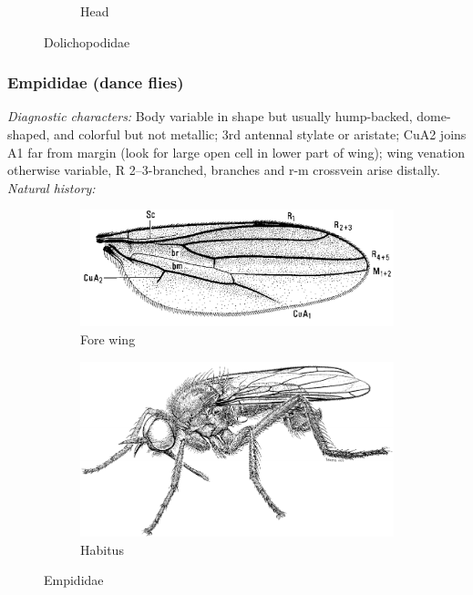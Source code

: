\documentclass[letterpaper, 11pt]{article}
\begin{document}
\begin{figure}[ht!]
\begin{subfigure}[ht!]{0.22\textwidth}
        \caption{Head \citep[][Fig. 48.4]{mcalpine1981manual}}
        \label{fig:dolicho2}
    \end{subfigure}
    \caption{Dolichopodidae}\label{fig:dolichos}
\end{figure}

\subsubsection{Empididae (dance flies)}
\noindent{}\textit{Diagnostic characters:} Body variable in shape but usually hump-backed, dome-shaped, and colorful but not metallic; 3rd antennal stylate or aristate; CuA2 joins A1 far from margin (look for large open cell in lower part of wing); wing venation otherwise variable, R 2--3-branched, branches and r-m crossvein arise distally.\\ %

\noindent{}\textit{Natural history:} \\

\begin{figure}[ht!]
    \centering
    \begin{subfigure}[ht!]{0.45\textwidth}
        \includegraphics[width=\textwidth]{EmpididWing}
        \caption{Fore wing \citep[][Fig. 47.3]{mcalpine1981manual}}
        \label{fig:empidid1}
    \end{subfigure}
    \qquad
    \begin{subfigure}[ht!]{0.42\textwidth}
        \includegraphics[width=\textwidth]{EmpididHabitus}
        \caption{Habitus \citep[][Fig. 47.1]{mcalpine1981manual}}
        \label{fig:empidid2}
    \end{subfigure}
    \caption{Empididae}\label{fig:empidids}
\end{figure}
\end{document}
